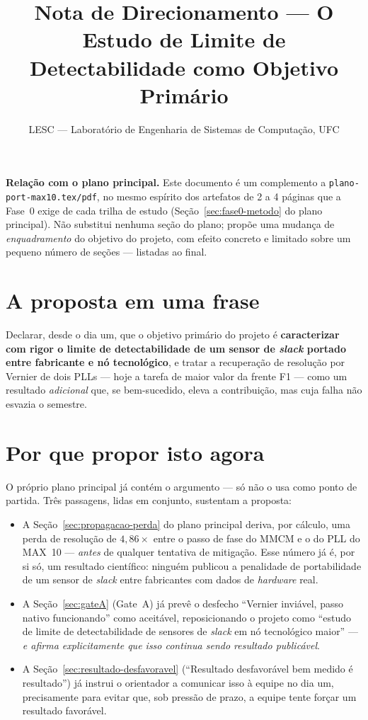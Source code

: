 \documentclass[11pt,a4paper]{article}
\title{Nota de Direcionamento --- O Estudo de Limite de Detectabilidade como Objetivo Primário}
\author{LESC --- Laboratório de Engenharia de Sistemas de Computação, UFC}
\date{}
\begin{document}
\maketitle
\thispagestyle{fancy}

\noindent\textbf{Relação com o plano principal.} Este documento é um complemento a
\texttt{plano-port-max10.tex/pdf}, no mesmo espírito dos artefatos de 2 a 4 páginas
que a Fase~0 exige de cada trilha de estudo (Seção~\ref{sec:fase0-metodo} do plano principal). Não
substitui nenhuma seção do plano; propõe uma mudança de \emph{enquadramento} do
objetivo do projeto, com efeito concreto e limitado sobre um pequeno número de
seções --- listadas ao final.

\section{A proposta em uma frase}

Declarar, desde o dia um, que o objetivo primário do projeto é \textbf{caracterizar
com rigor o limite de detectabilidade de um sensor de \emph{slack} portado entre
fabricante e nó tecnológico}, e tratar a recuperação de resolução por Vernier de
dois PLLs --- hoje a tarefa de maior valor da frente F1 --- como um resultado
\emph{adicional} que, se bem-sucedido, eleva a contribuição, mas cuja falha não
esvazia o semestre.

\section{Por que propor isto agora}

O próprio plano principal já contém o argumento --- só não o usa como ponto de
partida. Três passagens, lidas em conjunto, sustentam a proposta:

\begin{itemize}
  \item A Seção~\ref{sec:propagacao-perda} do plano principal deriva, por cálculo, uma perda de resolução
        de $4{,}86\times$ entre o passo de fase do MMCM e o do PLL do MAX~10 ---
        \emph{antes} de qualquer tentativa de mitigação. Esse número já é, por si
        só, um resultado científico: ninguém publicou a penalidade de portabilidade
        de um sensor de \emph{slack} entre fabricantes com dados de \emph{hardware}
        real.
  \item A Seção~\ref{sec:gateA} (Gate~A) já prevê o desfecho ``Vernier inviável, passo nativo
        funcionando'' como aceitável, reposicionando o projeto como ``estudo de
        limite de detectabilidade de sensores de \emph{slack} em nó tecnológico
        maior'' --- \emph{e afirma explicitamente que isso continua sendo resultado
        publicável}.
  \item A Seção~\ref{sec:resultado-desfavoravel} (``Resultado desfavorável bem medido é resultado'') já instrui
        o orientador a comunicar isso à equipe no dia um, precisamente para evitar
        que, sob pressão de prazo, a equipe tente forçar um resultado favorável.
\end{itemize}
\end{document}
